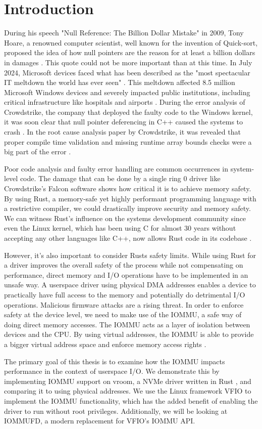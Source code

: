 \chapter{Introduction}\label{c:introduction}

During his speech "Null Reference: The Billion Dollar Mistake" in 2009, Tony Hoare, a renowned computer scientist, well known for the invention of Quick-sort, proposed the idea of how null pointers are the reason for at least a billion dollars in damages \cite{billiondollarmistake}. This quote could not be more important than at this time. In July 2024, Microsoft devices faced what has been described as the "most spectacular IT meltdown the world has ever seen" \cite{bloombergmeltdown}. This meltdown affected 8.5 million Microsoft Windows devices and severely impacted public institutions, including critical infrastructure like hospitals and airports \cite{bloomberg8milliondevices}. During the error analysis of Crowdstrike, the company that deployed the faulty code to the Windows kernel, it was soon clear that null pointer deferencing in C++ caused the systems to crash \cite{heisenullpointer}. In the root cause analysis paper by Crowdstrike, it was revealed that proper compile time validation and missing runtime array bounds checks were a big part of the error \cite{crowdstrikerca}.

Poor code analysis and faulty error handling are common occurrences in system-level code. The damage that can be done by a single ring 0 driver like Crowdstrike's Falcon software shows how critical it is to achieve memory safety. By using Rust, a memory-safe yet highly performant programming language with a restrictive compiler, we could drastically improve security and memory safety. We can witness Rust's influence on the systems development community since even the Linux kernel, which has been using C for almost 30 years without accepting any other languages like C++, now allows Rust code in its codebase \cite{linuxrustpull}.

However, it's also important to consider Rusts safety limits. While using Rust for a driver improves the overall safety of the process while not compensating on performance, direct memory and I/O operations have to be implemented in an unsafe way. A userspace driver using physical DMA addresses enables a device to practically have full access to the memory and potentially do detrimental I/O operations. Malicious firmware attacks are a rising threat.
In order to enforce safety at the device level, we need to make use of the IOMMU, a safe way of doing direct memory accesses. The IOMMU acts as a layer of isolation between devices and the CPU. By using virtual addresses, the IOMMU is able to provide a bigger virtual address space and enforce memory access rights \cite{OLS2007}.

The primary goal of this thesis is to examine how the IOMMU impacts performance in the context of userspace I/O.
We demonstrate this by implementing IOMMU support on vroom, a NVMe driver written in Rust \cite{vroom}, and comparing it to using physical addresses. We use the Linux framework VFIO to implement the IOMMU functionality, which has the added benefit of enabling the driver to run without root privileges. Additionally, we will be looking at IOMMUFD, a modern replacement for VFIO's IOMMU API.
